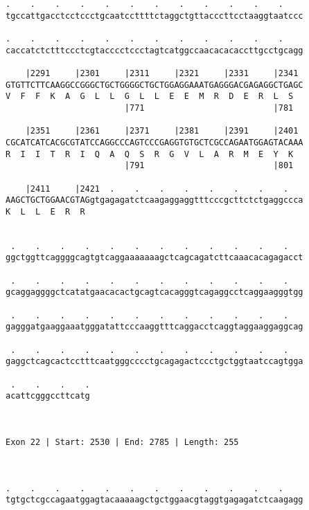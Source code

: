 \documentclass{article}
\begin{document}
\begin{Verbatim}
.    .    .    .    .    .    .    .    .    .    .    .    
tgccattgacctcctccctgcaatccttttctaggctgttacccttcctaaggtaatccc
                                                            
.    .    .    .    .    .    .    .    .    .    .    .    
caccatctctttccctcgtacccctccctagtcatggccaacacacaccttgcctgcagg
                                                            
    |2291     |2301     |2311     |2321     |2331     |2341 
GTGTTCTTCAAGGCCGGGCTGCTGGGGCTGCTGGAGGAAATGAGGGACGAGAGGCTGAGC
V  F  F  K  A  G  L  L  G  L  L  E  E  M  R  D  E  R  L  S  
                        |771                          |781  
  
    |2351     |2361     |2371     |2381     |2391     |2401 
CGCATCATCACGCGTATCCAGGCCCAGTCCCGAGGTGTGCTCGCCAGAATGGAGTACAAA
R  I  I  T  R  I  Q  A  Q  S  R  G  V  L  A  R  M  E  Y  K  
                        |791                          |801  
  
    |2411     |2421  .    .    .    .    .    .    .    .   
AAGCTGCTGGAACGTAGgtgagagatctcaagaggaggtttcccgcttctctgaggccca
K  L  L  E  R  R                                            
                                                            
  
 .    .    .    .    .    .    .    .    .    .    .    .   
ggctggttcaggggcagtgtcaggaaaaaaagctcagcagatcttcaaacacagagacct
                                                            
 .    .    .    .    .    .    .    .    .    .    .    .   
gcaggaggggctcatatgaacacactgcagtcacagggtcagaggcctcaggaagggtgg
                                                            
 .    .    .    .    .    .    .    .    .    .    .    .   
gagggatgaaggaaatgggatattcccaaggtttcaggacctcaggtaggaaggaggcag
                                                            
 .    .    .    .    .    .    .    .    .    .    .    .   
gaggctcagcactcctttcaatgggcccctgcagagactccctgctggtaatccagtgga
                                                            
 .    .    .    .
acattcgggccttcatg
                 
                 
 
Exon 22 | Start: 2530 | End: 2785 | Length: 255



.    .    .    .    .    .    .    .    .    .    .    .    
tgtgctcgccagaatggagtacaaaaagctgctggaacgtaggtgagagatctcaagagg
                                                            

\end{Verbatim}
\end{document}
